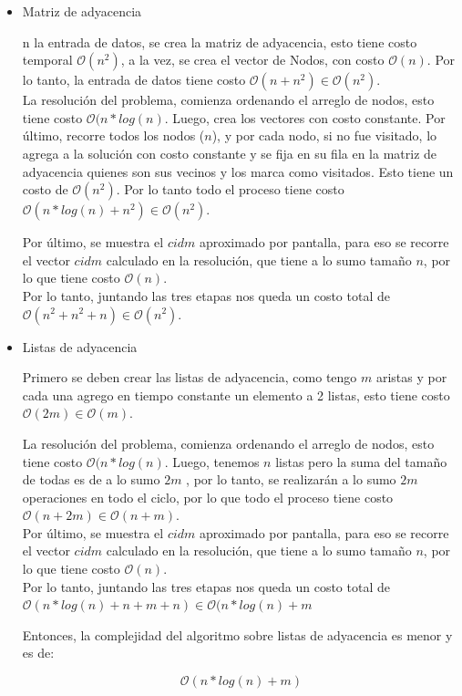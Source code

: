 \begin{itemize}

\item Matriz de adyacencia

n la entrada de datos, se crea la matriz de adyacencia, esto tiene costo temporal $\mathcal{O}(n^2)$, a la vez, se crea el vector de Nodos, con costo $\mathcal{O}(n)$. Por lo tanto, la entrada de datos tiene costo $\mathcal{O}(n + n^2) \in \mathcal{O}(n^2)$. \\ 

La resolución del problema, comienza ordenando el arreglo de nodos, esto tiene costo  $\mathcal{O}(n*log(n)$. Luego, crea los vectores con costo constante. Por último, recorre todos los nodos ($n$), y por cada nodo, si no fue visitado, lo agrega a la solución con costo constante y se fija en su fila en la matriz de adyacencia quienes son sus vecinos y los marca como visitados. Esto tiene un costo de $\mathcal{O}(n^2)$. Por lo tanto todo el proceso tiene costo $\mathcal{O}(n*log(n) + n^2) \in \mathcal{O}(n^2)$.

Por último, se muestra el $cidm$ aproximado por pantalla, para eso se recorre el vector $cidm$ calculado en la resolución, que tiene a lo sumo tamaño $n$, por lo que tiene costo $\mathcal{O}(n)$. \\ 

Por lo tanto, juntando las tres etapas nos queda un costo total de  $\mathcal{O}(n^2 + n^2 + n) \in \mathcal{O}(n^2)$.\\ 

\item Listas de adyacencia

Primero se deben crear las listas de adyacencia, como tengo $m$ aristas y por cada una agrego en tiempo constante un elemento a 2 listas, esto tiene costo $\mathcal{O}(2m) \in  \mathcal{O}(m)$.

La resolución del problema, comienza ordenando el arreglo de nodos, esto tiene costo  $\mathcal{O}(n*log(n)$. Luego, tenemos $n$ listas pero la suma del tamaño de todas es de a lo sumo $2m$ , por lo tanto, se realizarán a lo sumo $2m$ operaciones en todo el ciclo, por lo que todo el proceso tiene costo $\mathcal{O}(n + 2m) \in \mathcal{O}(n + m)$. \\ 

Por último, se muestra el $cidm$ aproximado por pantalla, para eso se recorre el vector $cidm$ calculado en la resolución, que tiene a lo sumo tamaño $n$, por lo que tiene costo $\mathcal{O}(n)$. \\ 

Por lo tanto, juntando las tres etapas nos queda un costo total de  $\mathcal{O}(n*log(n) + n + m + n) \in \mathcal{O}(n*log(n) + m $

Entonces, la complejidad del algoritmo sobre listas de adyacencia es menor y es de:

$$ \mathcal{O}(n*log(n) + m)$$

\end{itemize}

